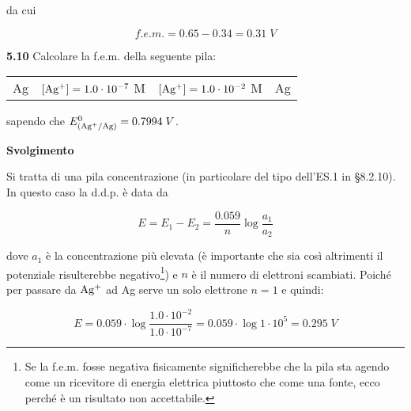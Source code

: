 da cui

$$f.e.m.=0.65 - 0.34 = 0.31\;V$$

\newpage

\textbf{5.10} Calcolare la f.e.m. della seguente pila:

\begin{center}
    \begin{tabular}{p{0.6cm}|p{3.6cm}||p{3.6cm}|p{1cm}}
        Ag & $[\rm Ag^+]=1.0 \cdot 10^{-7}$ M & $[\rm Ag^+]=1.0 \cdot 10^{-2}$ M & Ag
    \end{tabular}
\end{center}

sapendo che $E^0_{(\rm Ag^{+}/Ag)}=0.7994 \; V$.

\vspace{0.2cm}\large\textbf{Svolgimento}\normalsize

Si tratta di una pila concentrazione (in particolare del tipo dell'ES.1 in §8.2.10). In questo caso la d.d.p. è data da

$$E=E_1 - E_2 = \frac{0.059}{n} \log \frac{a_1}{a_2}$$

dove $a_1$ è la concentrazione più elevata (è importante che sia così altrimenti il potenziale risulterebbe negativo\footnote{Se la f.e.m. fosse negativa fisicamente significherebbe che la pila sta agendo come un ricevitore di energia elettrica piuttosto che come una fonte, ecco perché è un risultato non accettabile.}) e $n$ è il numero di elettroni scambiati. Poiché per passare da $\rm Ag^{+}$ ad Ag serve un solo elettrone $n=1$ e quindi:

$$E=0.059 \cdot \log \frac{1.0 \cdot 10^{-2}}{1.0 \cdot 10^{-7}}
=0.059 \cdot \log 1 \cdot 10^{5}
=0.295 \; V$$